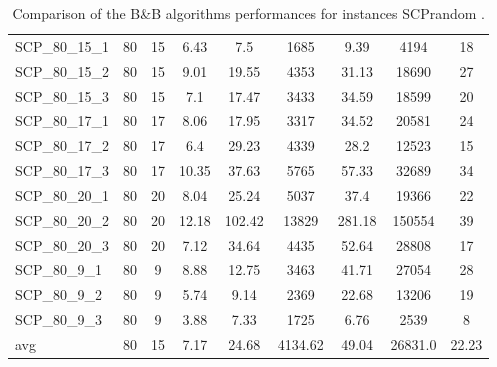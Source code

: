 \begin{table}[!ht]
{\begin{tabular}{lcccccccc}
SCP\_80\_15\_1 & 80 & 15 &  \textcolor{blue2}{6.43} & 7.5 & 1685 & 9.39 & 4194 & 18 \\
SCP\_80\_15\_2 & 80 & 15 &  \textcolor{blue2}{9.01} & 19.55 & 4353 & 31.13 & 18690 & 27 \\
SCP\_80\_15\_3 & 80 & 15 &  \textcolor{blue2}{7.1} & 17.47 & 3433 & 34.59 & 18599 & 20 \\
SCP\_80\_17\_1 & 80 & 17 &  \textcolor{blue2}{8.06} & 17.95 & 3317 & 34.52 & 20581 & 24 \\
SCP\_80\_17\_2 & 80 & 17 &  \textcolor{blue2}{6.4} & 29.23 & 4339 & 28.2 & 12523 & 15 \\
SCP\_80\_17\_3 & 80 & 17 &  \textcolor{blue2}{10.35} & 37.63 & 5765 & 57.33 & 32689 & 34 \\
SCP\_80\_20\_1 & 80 & 20 &  \textcolor{blue2}{8.04} & 25.24 & 5037 & 37.4 & 19366 & 22 \\
SCP\_80\_20\_2 & 80 & 20 &  \textcolor{blue2}{12.18} & 102.42 & 13829 & 281.18 & 150554 & 39 \\
SCP\_80\_20\_3 & 80 & 20 &  \textcolor{blue2}{7.12} & 34.64 & 4435 & 52.64 & 28808 & 17 \\
SCP\_80\_9\_1 & 80 & 9 &  \textcolor{blue2}{8.88} & 12.75 & 3463 & 41.71 & 27054 & 28 \\
SCP\_80\_9\_2 & 80 & 9 &  \textcolor{blue2}{5.74} & 9.14 & 2369 & 22.68 & 13206 & 19 \\
SCP\_80\_9\_3 & 80 & 9 &  \textcolor{blue2}{3.88} & 7.33 & 1725 & 6.76 & 2539 & 8 \\
\cline{1-9} avg & 80 & 15 & 7.17 & 24.68& 4134.62 & 49.04& 26831.0 & 22.23\\ \cline{1-9}
\bottomrule
\end{tabular}
}%
\caption{Comparison of the B\&B algorithms performances for instances SCPrandom .}
\label{tab:table_EPSILONvsBBvsEPBBB_SCPrandom }
\end{table}
